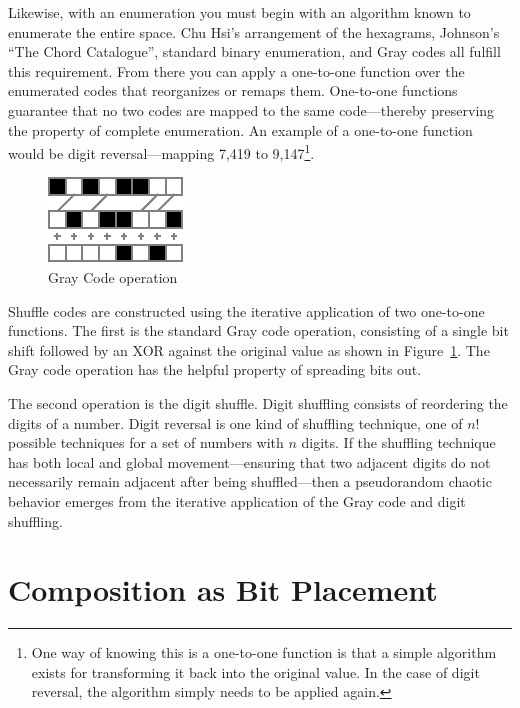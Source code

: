 \documentclass{thesis}
\begin{document}
Likewise, with an enumeration you must begin with an algorithm known to enumerate the entire space. Chu Hsi's arrangement of the hexagrams, Johnson's ``The Chord Catalogue'', standard binary enumeration, and Gray codes all fulfill this requirement. From there you can apply a one-to-one function over the enumerated codes that reorganizes or remaps them. One-to-one functions guarantee that no two codes are mapped to the same code---thereby preserving the property of complete enumeration. An example of a one-to-one function would be digit reversal---mapping 7,419 to 9,147\footnote{One way of knowing this is a one-to-one function is that a simple algorithm exists for transforming it back into the original value. In the case of digit reversal, the algorithm simply needs to be applied again.}.

\begin{figure}
	\begin{center}
		\includegraphics[scale=1.5]{graphics/gray-operation.pdf}
		\caption{Gray Code operation}
		\label{gray-operation}
	\end{center}
\end{figure}

Shuffle codes are constructed using the iterative application of two one-to-one functions. The first is the standard Gray code operation, consisting of a single bit shift followed by an XOR against the original value as shown in Figure~\ref{gray-operation}. The Gray code operation has the helpful property of spreading bits out.

The second operation is the digit shuffle. Digit shuffling consists of reordering the digits of a number. Digit reversal is one kind of shuffling technique, one of $n!$ possible techniques for a set of numbers with $n$ digits. If the shuffling technique has both local and global movement---ensuring that two adjacent digits do not necessarily remain adjacent after being shuffled---then a pseudorandom chaotic behavior emerges from the iterative application of the Gray code and digit shuffling.

\section{Composition as Bit Placement}
\end{document}
